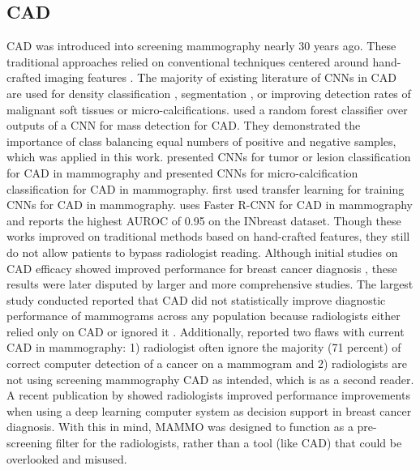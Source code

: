 \documentclass[journal]{IEEEtran}
\begin{document}
\subsection{CAD}

CAD was introduced into screening mammography nearly 30 years ago.  These traditional approaches relied on conventional techniques centered around hand-crafted imaging features \cite{jamieson-2012}.  The majority of existing literature of CNNs in CAD are used for density classification \cite{fonseca-2015, kallenberg-2016, wu-etal-2017, ahn-2017, mohamed-2018}, segmentation \cite{ dhungel-2015c, zhu-2016, demoor-2018}, or improving detection rates of malignant soft tissues or micro-calcifications. \cite{kooi-2016} used a random forest classifier over outputs of a CNN for mass detection for CAD.  They demonstrated the importance of class balancing equal numbers of positive and negative samples, which was applied in this work.   \cite{abbas-2016, jiao-2016} presented CNNs for tumor or lesion classification for CAD in mammography and \cite{samala-2016b, bekker-2016} presented CNNs for micro-calcification classification for CAD in mammography.  \cite{suzuki-2016, huynh-2016} first used transfer learning for training CNNs for CAD in mammography. \cite{ribli-2017} uses Faster R-CNN for CAD in mammography and reports the highest  AUROC of 0.95 on the INbreast dataset.  
Though these works improved on traditional methods based on hand-crafted features, they still do not allow patients to bypass radiologist reading.  Although initial studies on CAD efficacy showed improved performance for breast cancer diagnosis \cite{dheeba-2014}, these results were later disputed by larger and more comprehensive studies.  The largest study conducted reported that CAD did not statistically improve diagnostic performance of mammograms across any population because radiologists either relied only on CAD or ignored it \cite{lehman-2015}. Additionally, \cite{nishikawa-2018} reported two flaws with current CAD in mammography: 1) radiologist often ignore the majority (71 percent) of correct computer detection of a cancer on a mammogram and 2) radiologists are not using screening mammography CAD as intended, which is as a second reader.   A recent publication by \cite{karssemeijer-deeplearning} showed radiologists improved performance improvements when using a deep learning computer system as decision support in breast cancer diagnosis.  With this in mind, MAMMO was designed to function as a pre-screening filter for the radiologists, rather than a tool (like CAD) that could be overlooked and misused.
\end{document}
